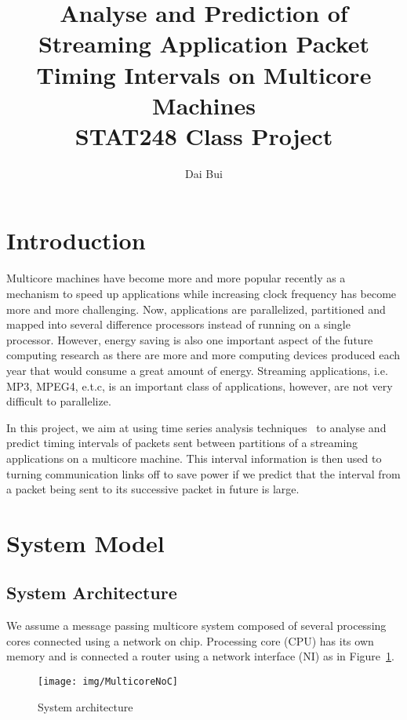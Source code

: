 \documentclass[12pt]{article}
\begin{document}
\title{Analyse and Prediction of Streaming
Application Packet Timing Intervals on Multicore Machines\\
STAT248 Class Project}
\author{Dai Bui}
\maketitle
\section{Introduction}
Multicore machines have become more and more popular recently as a mechanism to
speed up applications while increasing clock frequency has become more and more
challenging. Now, applications are parallelized, partitioned and mapped into
several difference processors instead of running on a single processor. However, energy
saving is also one important aspect of the future computing research as there
are more and more computing devices produced each year that would consume a great
amount of energy. Streaming applications, i.e. MP3, MPEG4, e.t.c, is an
important class of applications, however, are not very difficult to parallelize.

In this project, we aim at using time series analysis
techniques~\cite{BrillingerTimeSeries, ShumwayTimeSeries} to analyse and predict
timing intervals of packets sent between partitions of a streaming
applications on a multicore machine. This interval information is then used to
turning communication links off to save power if we predict that the interval
from a packet being sent to its successive packet in future is large. 

\section{System Model}
\subsection{System Architecture}
We assume a message passing multicore system composed of several processing
cores connected using a network on chip. Processing core (CPU) has its own
memory and is connected a router using a network interface (NI) as in
Figure~\ref{fig:MulticoreNoC}.

\begin{figure}[ht!]
\centering
\texttt{[image: img/MulticoreNoC]}
\caption{System architecture}\label{fig:MulticoreNoC}
\end{figure}
\end{document}
